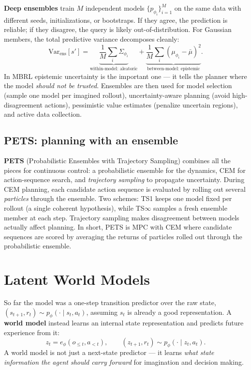 \documentclass[11pt, oneside]{book}
\newcommand{\Var}{\mathrm{Var}}
\begin{document}
\textbf{Deep ensembles} train $M$ independent models $\{p_{\phi_i}\}_{i=1}^M$ on the same
data with different seeds, initializations, or bootstraps. If they agree, the prediction is
reliable; if they disagree, the query is likely out-of-distribution. For Gaussian members,
the total predictive variance decomposes cleanly:
\[
  \Var_{\text{ens}}[s'] =
  \underbrace{\frac{1}{M}\sum_i \Sigma_{\phi_i}}_{\text{within-model: aleatoric}}
  + \underbrace{\frac{1}{M}\sum_i (\mu_{\phi_i} - \bar\mu)^2}_{\text{between-model: epistemic}}.
\]
In MBRL epistemic uncertainty is the important one --- it tells the planner where the model
\emph{should not be trusted}. Ensembles are then used for model selection (sample one model
per imagined rollout), uncertainty-aware planning (avoid high-disagreement actions),
pessimistic value estimates (penalize uncertain regions), and active data collection.

\subsection{PETS: planning with an ensemble}

\textbf{PETS} (Probabilistic Ensembles with Trajectory Sampling) combines all the pieces for
continuous control: a probabilistic ensemble for the dynamics, CEM for action-sequence
search, and \emph{trajectory sampling} to propagate uncertainty. During CEM planning, each
candidate action sequence is evaluated by rolling out several \emph{particles} through the
ensemble. Two schemes: TS1 keeps one model fixed per rollout (a single coherent hypothesis),
while TS$\infty$ samples a fresh ensemble member at each step. Trajectory sampling makes
disagreement between models actually affect planning. In short, PETS is MPC with CEM where
candidate sequences are scored by averaging the returns of particles rolled out through the
probabilistic ensemble.

\section{Latent World Models}

So far the model was a one-step transition predictor over the raw state,
$(s_{t+1}, r_t)\sim p_\phi(\cdot\mid s_t,a_t)$, assuming $s_t$ is already a good
representation. A \textbf{world model} instead learns an internal state representation and
predicts future experience from it:
\[
  z_t = e_\phi(o_{\le t}, a_{<t}), \qquad (z_{t+1}, r_t)\sim p_\phi(\cdot\mid z_t, a_t).
\]
A world model is not just a next-state predictor --- it learns \emph{what state information
the agent should carry forward} for imagination and decision making.
\end{document}
